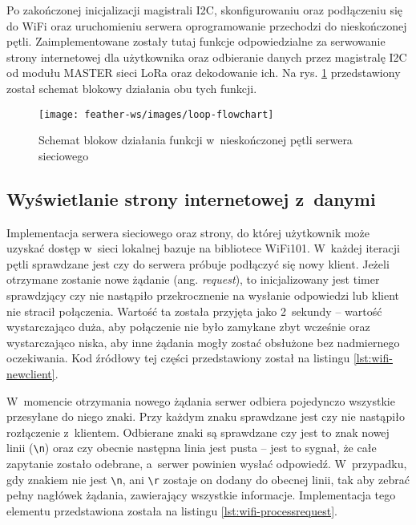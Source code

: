 Po zakończonej inicjalizacji magistrali I2C, skonfigurowaniu oraz podłączeniu się do WiFi oraz uruchomieniu serwera
oprogramowanie przechodzi do nieskończonej pętli. Zaimplementowane zostały tutaj funkcje odpowiedzialne za serwowanie
strony internetowej dla użytkownika oraz odbieranie danych przez magistralę I2C od modułu MASTER sieci LoRa oraz
dekodowanie ich. Na rys. \ref{img:webserver-flowchart} przedstawiony został schemat blokowy działania obu tych funkcji.

\begin{figure}[!htbp]
    \centering
    \texttt{[image: feather-ws/images/loop-flowchart]}
    \caption{\label{img:webserver-flowchart}Schemat blokow działania funkcji w~nieskończonej pętli serwera sieciowego}
\end{figure}

\subsection{\label{sect:webserver-website}Wyświetlanie strony internetowej z~danymi} Implementacja serwera sieciowego
oraz strony, do której użytkownik może uzyskać dostęp w~sieci lokalnej bazuje na bibliotece WiFi101. W~każdej iteracji
pętli sprawdzane jest czy do serwera próbuje podłączyć się nowy klient. Jeżeli otrzymane zostanie nowe żądanie (ang.
\textsl{request}), to inicjalizowany jest timer sprawdzjący czy nie nastąpiło przekrocznenie na wysłanie odpowiedzi lub
klient nie stracił połączenia. Wartość ta została przyjęta jako 2~sekundy -- wartość wystarczająco duża, aby połączenie
nie było zamykane zbyt wcześnie oraz wystarczająco niska, aby inne żądania mogły zostać obsłużone bez nadmiernego
oczekiwania. Kod źródłowy tej części przedstawiony został na listingu \ref{lst:wifi-newclient}.



W~momencie otrzymania nowego żądania serwer odbiera pojedynczo wszystkie przesyłane do niego znaki. Przy każdym znaku
sprawdzane jest czy nie nastąpiło rozłączenie z~klientem. Odbierane znaki są sprawdzane czy jest to znak nowej linii
(\texttt{\textbackslash n}) oraz czy obecnie następna linia jest pusta -- jest to sygnał, że całe zapytanie zostało
odebrane, a~serwer powinien wysłać odpowiedź. W~przypadku, gdy znakiem nie jest \texttt{\textbackslash n}, ani
\texttt{\textbackslash r} zostaje on dodany do obecnej linii, tak aby zebrać pełny nagłówek żądania, zawierający
wszystkie informacje. Implementacja tego elementu przedstawiona została na listingu \ref{lst:wifi-processrequest}.

